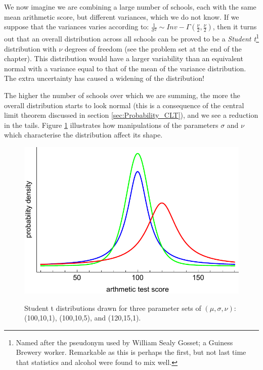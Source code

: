 \documentclass[11pt,fullpage]{book}
\begin{document}
We now imagine we are combining a large number of schools, each with the same mean arithmetic score, but different variances, which we do not know. If we suppose that the variances varies according to: $\frac{1}{\sigma^2}\sim Inv-\Gamma(\frac{\nu}{2},\frac{\nu}{2})$, then it turns out that an overall distribution across all schools can be proved to be a \textit{Student t}\footnote{Named after the pseudonym used by William Sealy Gosset; a Guiness Brewery worker. Remarkable as this is perhaps the first, but not last time that statistics and alcohol were found to mix well.} distribution with $\nu$ degrees of freedom (see the problem set at the end of the chapter). This distribution would have a larger variability than an equivalent normal with a variance equal to that of the mean of the variance distribution. The extra uncertainty has caused a widening of the distribution!

The higher the number of schools over which we are summing, the more the overall distribution starts to look normal (this is a consequence of the central limit theorem discussed in section \ref{sec:Probability_CLT}), and we see a reduction in the tails. Figure \ref{fig:Distributions_tArithmeticExposition} illustrates how manipulations of the parameters $\sigma$ and $\nu$ which characterise the distribution affect its shape.

\begin{figure}
\centering
\scalebox{0.5} 
{\includegraphics{Distributions_tArithmeticExposition.pdf}}
\caption{Student t distributions drawn for three parameter sets of $(\mu,\sigma,\nu)$: (100,10,1), (100,10,5), and (120,15,1).}\label{fig:Distributions_tArithmeticExposition}
\end{figure}
\end{document}
